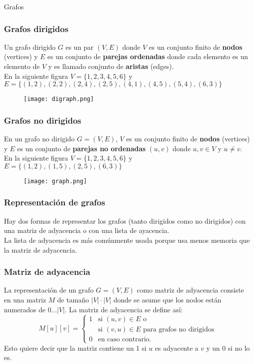 \documentclass{beamer}
\begin{document}
\begin{section}{Grafos}
	\begin{frame}
		\frametitle{Grafos dirigidos}
		Un grafo dirigido $G$ es un par $(V, E)$ donde $V$ es un conjunto finito de \textbf{nodos} (vertices) y $E$ es un conjunto de \textbf{parejas ordenadas} donde cada elemento es un elemento de $V$ y es llamado conjunto de \textbf{aristas} (edges).\\
		En la siguiente figura $V = \{1, 2, 3, 4, 5, 6\}$ y $E = \{(1, 2), (2, 2), (2, 4), (2, 5), (4, 1), (4, 5), (5, 4), (6, 3)\}$
		\begin{figure}
			\texttt{[image: digraph.png]}
		\end{figure}		
	\end{frame}
	
	\begin{frame}
		\frametitle{Grafos no dirigidos}
		En un grafo no dirigido $G = (V, E)$, $V$ es un conjunto finito de \textbf{nodos} (vertices) y $E$ es un conjunto de \textbf{parejas no ordenadas} $(u, v)$ donde $u, v \in V$ y $u \ne v$.\\
		En la siguiente figura $V = \{1, 2, 3, 4, 5, 6\}$ y $E = \{(1, 2), (1, 5), (2, 5), (6, 3)\}$
		\begin{figure}
			\texttt{[image: graph.png]}
		\end{figure}		
	\end{frame}
	
	\begin{frame}
		\frametitle{Representación de grafos}
		Hay dos formas de representar los grafos (tanto dirigidos como no dirigidos) con una matriz de adyacencia o con una lista de ayacencia.\\
		La lista de adyacencia es más comúnmente usada porque usa menos memoria que la matriz de adyacencia.
	\end{frame}
	
	\begin{frame}[fragile]
		\frametitle{Matriz de adyacencia}
		La representación de un grafo $G = (V, E)$ como matriz de adyacencia consiste en una matriz $M$ de tamaño $|V| \cdot |V|$ donde se asume que los nodos están numerados de $0 \ldots |V|$. La matriz de adyacencia se define así:
		\begin{equation}
			M[u][v] =
			\left\{
				\begin{array}{ll}
					1 & \mbox{si } (u, v) \in E \mbox{ o} \\
					  & \mbox{si } (v, u) \in E \mbox{ para grafos no dirigidos}\\
					0 & \mbox{en caso contrario.} 
				\end{array}
			\right.
		\end{equation}
		Esto quiere decir que la matriz contiene un 1 si $u$ es adyacente a $v$ y un 0 si no lo es.
	\end{frame}
	

\end{section}
\end{document}
